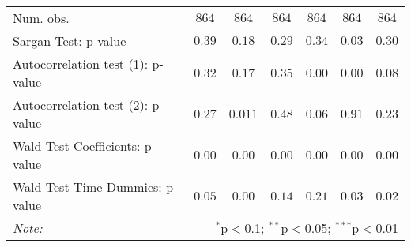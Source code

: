\begin{table}
\begin{center}
\begin{tabular}{l c c c c c c}
& & & & & & \\
\hline
Num. obs.                            & $864$        & $864$         & $864$        & $864$        & $864$         & $864$        \\
Sargan Test: p-value                 & $0.39$       & $0.18$        & $0.29$       & $0.34$       & $0.03$        & $0.30$       \\
Autocorrelation test (1): p-value &  $0.32$ & $0.17$ & $0.35$ & $0.00$ & $0.00$ & $0.08$ \\
Autocorrelation test (2): p-value & $0.27$ & $0.011$ & $0.48$ & $0.06$ & $0.91$ & $0.23$\\
Wald Test Coefficients: p-value      & $0.00$       & $0.00$        & $0.00$       & $0.00$       & $0.00$        & $0.00$       \\
Wald Test Time Dummies: p-value      & $0.05$       & $0.00$        & $0.14$       & $0.21$       & $0.03$        & $0.02$       \\
\hline
\textit{Note:}  & \multicolumn{6}{r}{$^{*}$p$<$0.1; $^{**}$p$<$0.05; $^{***}$p$<$0.01} \\ 
\end{tabular}
\label{table:GMM_table}
\end{center}
\end{table}
